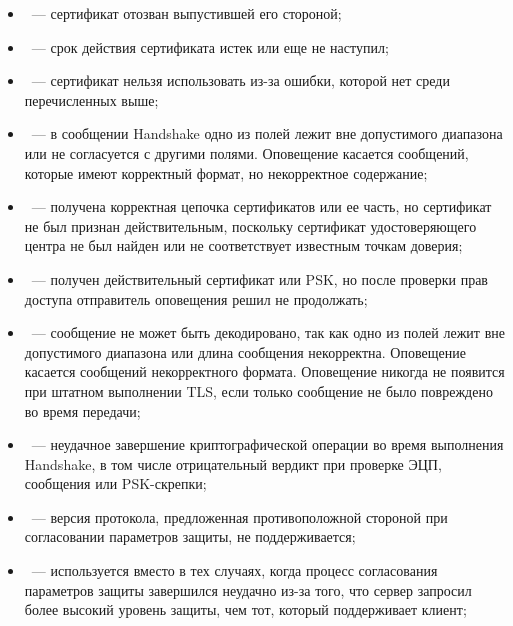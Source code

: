\begin{itemize}
\item\label{ALERT.Err.cr}
~--- сертификат отозван выпустившей его стороной;

\item\label{ALERT.Err.ce}
~--- срок действия сертификата истек 
или еще не наступил;

\item\label{ALERT.Err.cu}
~--- сертификат нельзя использовать из-за ошибки,
которой нет среди перечисленных выше;

\item\label{ALERT.Err.ip}
~--- в сообщении Handshake одно из полей лежит вне 
допустимого диапазона или не согласуется с другими полями. Оповещение 
касается сообщений, которые имеют корректный формат, но некорректное 
содержание; 

\item\label{ALERT.Err.uca}
~--- получена корректная цепочка сертификатов или ее часть, но
сертификат не был признан действительным, поскольку сертификат удостоверяющего
центра не был найден или не соответствует известным точкам доверия;

\item\label{ALERT.Err.ad}
~--- получен действительный сертификат или PSK, 
но после проверки прав доступа отправитель оповещения решил не продолжать; 

\item\label{ALERT.Err.de}
~--- сообщение не может быть декодировано, так как одно из
полей лежит вне допустимого диапазона или длина сообщения некорректна.
Оповещение касается сообщений некорректного формата.
%
Оповещение никогда не появится при штатном выполнении TLS, если только 
сообщение не было повреждено во время передачи;

\item\label{ALERT.Err.de2}
~--- 
неудачное завершение криптографической операции во время выполнения Handshake, 
в том числе отрицательный вердикт при проверке ЭЦП, сообщения 
 или PSK-скрепки;

\item\label{ALERT.Err.pv}
~--- версия протокола, предложенная противоположной 
стороной при согласовании параметров защиты, не поддерживается;

\item\label{ALERT.Err.is}
~--- используется вместо 
 в тех случаях, когда процесс 
согласования параметров защиты завершился неудачно из-за того, что сервер 
запросил более высокий уровень защиты, чем тот, который поддерживает клиент;


\end{itemize}
